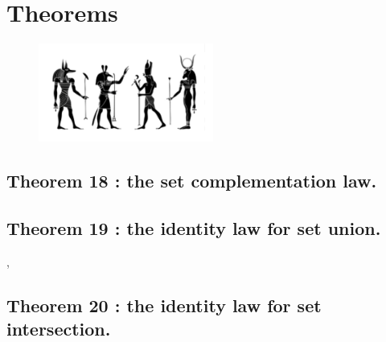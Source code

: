 \documentclass[preview]{standalone}
\begin{document}
\section{Theorems}
\begin{figure}[!h]
    \centering
    \includegraphics[width=5.75cm]{../resources/jpg/2.2.set.operations/set.jpg}
\end{figure}


\subsection[The set complementation law.]
    {
        \color{section}Theorem 18 \color{black} : the set complementation law.
    }

\pagebreak


\subsection[The identity law for set union.]
    {
        \color{section}Theorem 19 \color{black} : the identity law for set union.
    }

\sep


\subsection[The identity law for set intersection.]
    {
        \color{section}Theorem 20 \color{black} : the identity law for set intersection.
    }

\pagebreak


\end{document}
